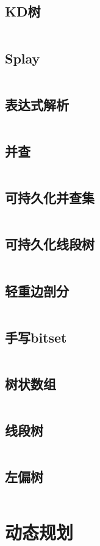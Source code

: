 \documentclass[UTF8]{ctexart}
\begin{document}
\subsection{KD树}
\inputminted{cpp}{datastructure/KD树.cpp}
\subsection{Splay}
\inputminted{cpp}{datastructure/Splay.cpp}
\subsection{表达式解析}
\inputminted{cpp}{datastructure/表达式解析.cpp}
\subsection{并查}
\inputminted{cpp}{datastructure/并查.cpp}
\subsection{可持久化并查集}
\inputminted{cpp}{datastructure/可持久化并查集.cpp}
\subsection{可持久化线段树}
\inputminted{cpp}{datastructure/可持久化线段树.cpp}
\subsection{轻重边剖分}
\inputminted{cpp}{datastructure/轻重边剖分.cpp}
\subsection{手写bitset}
\inputminted{cpp}{datastructure/手写bitset.cpp}
\subsection{树状数组}
\inputminted{cpp}{datastructure/树状数组.cpp}
\subsection{线段树}
\inputminted{cpp}{datastructure/线段树.cpp}
\subsection{左偏树}
\inputminted{cpp}{datastructure/左偏树.cpp}
\section{动态规划}
\end{document}
